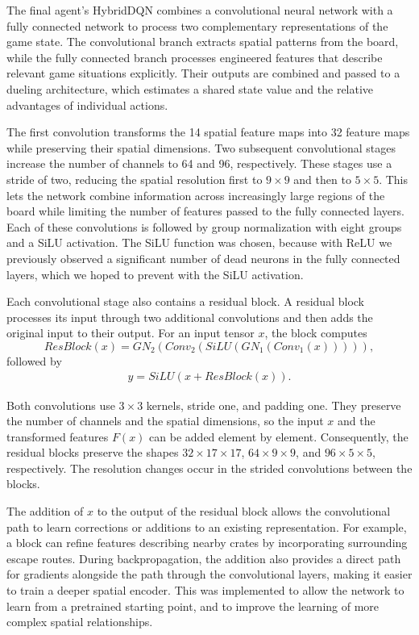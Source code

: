 \documentclass[11pt,a4paper]{article}
\begin{document}
The final agent’s HybridDQN combines a convolutional neural network with a fully connected network to process two complementary representations of the game state. The convolutional branch extracts spatial patterns from the board, while the fully connected branch processes engineered features that describe relevant game situations explicitly. Their outputs are combined and passed to a dueling architecture, which estimates a shared state value and the relative advantages of individual actions.

The first convolution transforms the 14 spatial feature maps into 32 feature maps while preserving their spatial dimensions. Two subsequent convolutional stages increase the number of channels to 64 and 96, respectively. These stages use a stride of two, reducing the spatial resolution first to \(9\times9\) and then to \(5\times5\). This lets the network combine information across increasingly large regions of the board while limiting the number of features passed to the fully connected layers. Each of these convolutions is followed by group normalization with eight groups and a SiLU activation. The SiLU function was chosen, because with ReLU we previously observed a significant number of dead neurons in the fully connected layers, which we hoped to prevent with the SiLU activation.

Each convolutional stage also contains a residual block. A residual block processes its input through two additional convolutions and then adds the original input to their output. For an input tensor \(x\), the block computes
\begin{equation}
    ResBlock (x) = GN_2(Conv_2(SiLU(GN_1(Conv_1(x))))),
\end{equation}
followed by
\begin{align}
    y = SiLU(x + ResBlock(x)).
\end{align}

Both convolutions use \(3\times3\) kernels, stride one, and padding one. They preserve the number of channels and the spatial dimensions, so the input \(x\) and the transformed features \(F(x)\) can be added element by element. Consequently, the residual blocks preserve the shapes \(32\times17\times17\), \(64\times9\times9\), and \(96\times5\times5\), respectively. The resolution changes occur in the strided convolutions between the blocks.

The addition of \(x\) to the output of the residual block allows the convolutional path to learn corrections or additions to an existing representation. For example, a block can refine features describing nearby crates by incorporating surrounding escape routes. During backpropagation, the addition also provides a direct path for gradients alongside the path through the convolutional layers, making it easier to train a deeper spatial encoder. This was implemented to allow the network to learn from a pretrained starting point, and to improve the learning of more complex spatial relationships.
\end{document}
